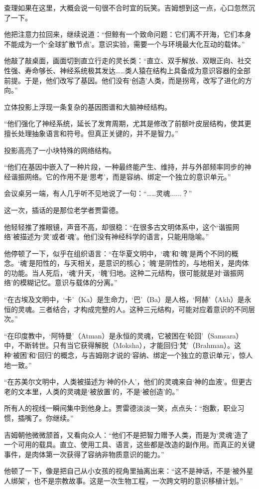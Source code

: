 查理如果在这里，大概会说一句很不合时宜的玩笑。吉姆想到这一点，心口忽然沉了一下。

他把注意力拉回来，继续说道：“但鲸有一个致命问题：它们离不开海，它们本身不能成为一个‘全球扩散节点’。意识实验，需要一个与环境最大化互动的载体。”

他敲了敲桌面，画面切到直立行走的灵长类：“直立、双手解放、双眼正向、社交性强、寿命够长、神经系统极其发达……类人猿在结构上具备成为意识容器的全部前提。于是，他们改写了基因。他们没有‘创造’人类，而是拐弯，改写了进化的方向。”

立体投影上浮现一条复杂的基因图谱和大脑神经结构。

“他们强化了神经系统，延长了发育周期，尤其是修改了前额叶皮层结构，使其更擅长处理抽象语言和符号。但真正关键的，并不是智力。”

投影高亮了一小块特殊的网络结构。

“他们在基因中嵌入了一种片段，一种最终能产生、维持，并与外部频率同步的神经谐振网络。它的作用不是‘思考’，而是容纳、绑定一个独立的意识单元。”

会议桌另一端，有人几乎听不见地说了一句：“……灵魂......？”

这一次，插话的是那位老学者贾雷德。

他轻轻推了推眼镜，声音不高，却很稳：“在很多古文明体系中，这个‘谐振网络’被描述为‘灵’或者‘魂’。他们没有神经科学的语言，只能用隐喻。”

他停顿了一下，似乎在组织语言：“在华夏文明中，‘魂’和‘魄’是两个不同的概念。‘魂’是阳性的，与天相关，是意识的核心；‘魄’是阴性的，与地相关，是肉体的功能。当人死后，‘魂’升天，‘魄’归地。这种二元结构，很可能就是对‘谐振网络’的模糊记忆。意识与载体的分离。”

“在古埃及文明中，‘卡’（Ka）是生命力，‘巴’（Ba）是人格，‘阿赫’（Akh）是永恒的灵魂。三者结合，才构成完整的人。这种三元结构，可能对应着意识的不同层次。”

“在印度教中，‘阿特曼’（Atman）是永恒的灵魂，它被困在‘轮回’（Samsara）中，不断转世。只有当它获得解脱（Moksha），才能回归‘梵’（Brahman）。这种‘被困’和‘回归’的概念，与吉姆刚才说的‘容纳、绑定一个独立的意识单元’，惊人地一致。”

“在苏美尔文明中，人类被描述为‘神的仆人’，他们的灵魂来自‘神的血液’。但更古老的文本里，人类的灵魂是‘被放置’的，不是‘被创造’的。”

所有人的视线一瞬间集中到他身上。贾雷德淡淡一笑，点点头：“抱歉，职业习惯，插嘴了。你继续。”

吉姆朝他微微颔首，又看向众人：“他们不是把智力赠予人类，而是为‘灵魂’造了一个可用的载具。直立、使用工具、语言，这些都是改造的副作用。而真正的关键事件，是肉体第一次获得了容纳非物质意识的能力。”

他顿了一下，像是把自己从小女孩的视角里抽离出来：“这不是神话，不是‘被外星人绑架’，也不是宗教故事。这是一次生物工程，一次跨文明的意识移植计划。”
